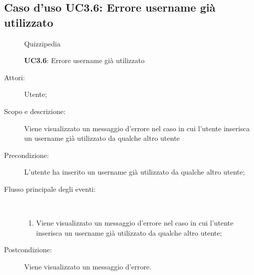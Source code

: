 \subsection{Caso d'uso UC3.6: Errore username già utilizzato}
	\begin{figure}[H]
		\centering
		\begin{resizedtikzpicture}{\textwidth}
		\begin{umlsystem}[x=0, fill=lightgray!20]{Quizzipedia}
		\end{umlsystem}
		\end{resizedtikzpicture}
		\caption{\textbf{UC3.6}: Errore username già utilizzato}
		\label{UC3.6}
	\end{figure}
\begin{description}
\item[Attori:] Utente;
\item[Scopo e descrizione:] Viene visualizzato un messaggio d'errore nel caso in cui l'utente inserisca un username già utilizzato da qualche altro utente
      \item[Precondizione:] L'utente ha inserito un username già utilizzato da qualche altro utente;

        \item[Flusso principale degli eventi:] \ 
 \begin{enumerate}
          \item Viene visualizzato un messaggio d'errore nel caso in cui l'utente inserisca un username già utilizzato da qualche altro utente;

      \end{enumerate}
    \item[Postcondizione:] Viene visualizzato un messaggio d'errore.
  \end{description}
\hypertarget{UC3.7}{}
